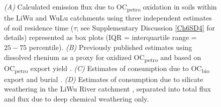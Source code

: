 \begin{figure}[p]
	\caption[ source and sink flux estimates from various processes in the Central Range]{\textit{(A)} Calculated  emission flux due to OC\textsubscript{petro} oxidation in soils within the LiWu and WuLu catchments using three independent estimates of soil residence time ($\tau$; see Supplementary Discussion \ref{Ch6SD4} for details) represented as box plots (IQR = interquartile range = $25 - 75$ percentile). \textit{(B)} Previously published estimates using dissolved rhenium as a proxy for oxidized OC\textsubscript{petro} \citep[orange bars;][]{Hilton:2014dh} and based on OC\textsubscript{petro} export yield \citep[black arrow;][]{Hilton:2011jw}. \textit{(C)} Estimates of  consumption due to OC\textsubscript{bio} export and burial \citep[mean $\pm 1$ std. dev.;][]{Hilton:2012dt}. \textit{(D)} Estimates of  consumption due to silicate weathering in the LiWu River catchment \citep{Calmels:2011gv}, separated into total flux and flux due to deep chemical weathering only.}

\end{figure}
